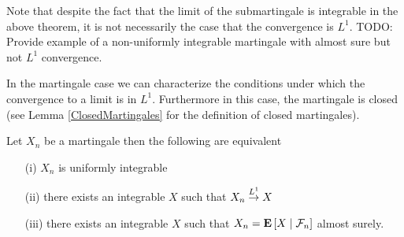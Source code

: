 Note that despite the fact that the limit of the submartingale is
integrable in the above theorem, it is not necessarily the case that the
convergence is $L^1$.
TODO: Provide example of a non-uniformly integrable martingale with
almost sure but not $L^1$ convergence.

In the martingale case we can characterize the conditions under which
the convergence to a limit is in $L^1$.  Furthermore in this case, the
martingale is closed (see Lemma \ref{ClosedMartingales} for the
definition of closed martingales).
\begin{thm}\label{L1MartingaleConvergenceTheoremDiscrete}Let $X_n$ be a martingale then the following are equivalent
\begin{itemize}
\item[(i)]$X_n$ is uniformly
  integrable
\item[(ii)]there exists an integrable $X$  such that
  $X_n \tolp{1} X$
\item[(iii)]there exists an integrable $X$ such that
  $X_n = \cexpectationlong{\mathcal{F}_n}{X}$ almost surely.
\end{itemize}
\end{thm}
